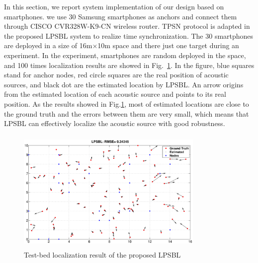 In this section, we report system implementation of our design based on smartphones.
we use 30 Samsung smartphones as anchors and connect them through CISCO CVR328W-K9-CN wireless router. 
TPSN protocol is adapted in the proposed LPSBL system to realize time synchronization.
The 30 smartphones are deployed in a size of 16m$\times$10m space and there just one target during an experiment.
In the experiment, smartphones are random deployed in the space, and 100 times localization results are showed in Fig.~\ref{fig7}. 
In the figure, blue squares stand for anchor
nodes, red circle squares are the real position of acoustic sources, and black dot are the estimated location by LPSBL. 
An arrow origins from the estimated location of each acoustic source and points to its real position. 
As the results showed in Fig.\ref{fig7}, most of estimated locations are close to the ground truth and the errors between them are very small,
which means that LPSBL can effectively localize the acoustic source with good robustness.
  \begin{figure}[htb]
			\vspace{-3mm}
            \includegraphics[height=6cm,width=9.0cm]{image/emulation.eps}
             \caption{Test-bed localization result of the proposed LPSBL}
             \vspace{-5mm}
             \label{fig7}
        \end{figure}
